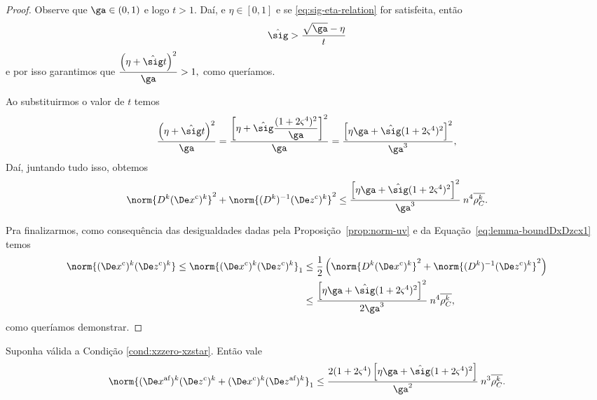 \begin{proof}
Observe que $\ga\in(0,1)$ e logo $t > 1$.  Daí, e $\eta\in[0,1]$ e   se \eqref{eq:sig-eta-relation} for satisfeita, então 
\[
\nextsig > \dfrac{\sqrt{\ga} - \eta}{t}
\]
e por isso garantimos que 
$
	\dfrac{\left(\eta +{\nextsig} t \right)^{2}}{\ga} >1,
$
como queríamos.

Ao substituirmos o valor de $t$ temos 
\[
	\dfrac{\left(\eta +{\nextsig} t \right)^{2}}{\ga} = \dfrac{\left[\eta + \nextsig\dfrac{(1+2\bdxzstar^{4})^{2}}{\ga}\right]^{2}}{\ga} = \dfrac{\left[\eta\ga + \nextsig(1+2\bdxzstar^{4})^{2}\right]^{2}}{\ga^{3}},
\] 
Daí, juntando tudo isso, obtemos
	\begin{equation}\label{eq:lemma-boundDxDzcx1}
		\norm{\Dk\Dekcox}^{2} + \norm{\Dik\Dekcoz}^{2} \leq \dfrac{\left[\eta\ga + \nextsig(1+2\bdxzstar^{4})^{2}\right]^{2}}{\ga^{3}} \: n^{4}\rhoCkb.
	\end{equation}

Pra finalizarmos, como consequência  das desigualdades dadas pela Proposição~\ref{prop:norm-uv} e da Equação~\eqref{eq:lemma-boundDxDzcx1} temos
\[
\begin{aligned}  				 
	\norm{ \Dekcox  \Dekcoz  } \leq \norm{ \Dekcox  \Dekcoz  }_{1}   & \leq \frac{1}{2}\left(\norm{\Dk \Dekcox}^{2} + \norm{\Dik  \Dekcoz  }^{2}\right) \notag
  					\\ 
  					& \leq \dfrac{\left[\eta\ga + \nextsig(1+2\bdxzstar^{4})^{2}\right]^{2}}{2\ga^{3}} \: n^{4}\rhoCkb,
\end{aligned}
\]
como queríamos demonstrar.
\end{proof}

\begin{lema}\label{lemma:boundDxDzaff-c}
	Suponha válida a Condição  \ref{cond:xzzero-xzstar}. Então vale 
	\begin{equation}\label{eq:lemma-boundDxDzaff-c}
		\norm{ \dekx\Dekcoz + \Dekcox  \dekz  }_{1} \leq \dfrac{2(1+2\bdxzstar^{4})\left[\eta\ga + \nextsig(1+2\bdxzstar^{4})^{2}\right]}{\ga^{2}}\: n^{3}\rhoCkb.
	\end{equation}

\end{lema}

